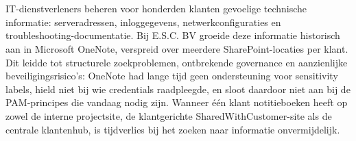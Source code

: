 
%
%
%
%
%

%



\chapter*{}

IT-dienstverleners beheren voor honderden klanten gevoelige technische informatie: serveradressen, inloggegevens, netwerkconfiguraties en troubleshooting-documentatie. Bij E.S.C. BV groeide deze informatie historisch aan in Microsoft OneNote, verspreid over meerdere SharePoint-locaties per klant. Dit leidde tot structurele zoekproblemen, ontbrekende governance en aanzienlijke beveiligingsrisico's: OneNote had lange tijd geen ondersteuning voor sensitivity labels, hield niet bij wie credentials raadpleegde, en sloot daardoor niet aan bij de PAM-principes die vandaag nodig zijn. Wanneer één klant notitieboeken heeft op zowel de interne projectsite, de klantgerichte SharedWithCustomer-site als de centrale klantenhub, is tijdverlies bij het zoeken naar informatie onvermijdelijk.

